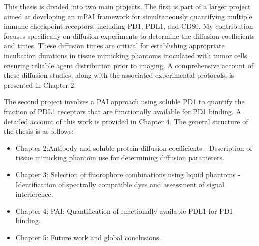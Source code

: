 This thesis is divided into two main projects. The first is part of a larger project aimed at developing an mPAI 
framework for simultaneously quantifying multiple immune checkpoint receptors, including PD1, PDL1, and CD80. 
My contribution focuses specifically on diffusion experiments to determine the diffusion coefficients and times. 
These diffusion times are critical for establishing appropriate incubation durations in tissue mimicking phantoms 
inoculated with tumor cells, ensuring reliable agent distribution prior to imaging. A comprehensive account of these 
diffusion studies, along with the associated experimental protocols, is presented in Chapter 2.

The second project involves a PAI approach using soluble PD1 to quantify the fraction of PDL1 receptors that are 
functionally available for PD1 binding. A detailed account of this work is provided in Chapter 4. The general structure of 
the thesis is as follows:

\begin{itemize}
    \item Chapter 2:Antibody and soluble protein diffusion coefficients - Description of tissue mimicking 
    phantom use for determining diffusion parameters.
    \item Chapter 3: Selection of fluorophore combinations using liquid phantoms - Identification of spectrally 
    compatible dyes and assessment of signal interference.
    \item Chapter 4: PAI:  Quantification of functionally available PDL1 for PD1 binding.
    \item Chapter 5: Future work and global conclusions.
\end{itemize}